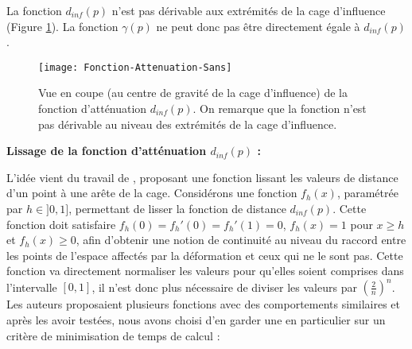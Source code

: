\begin{center}
\end{center}

\newpage

La fonction $d_{inf}(p)$ n'est pas dérivable aux extrémités de la cage d'influence
(Figure \ref{MELAtN}). La fonction $\gamma(p)$ ne peut donc pas être
directement égale à $d_{inf}(p)$.

\begin{figure}[!ht]
\texttt{[image: Fonction-Attenuation-Sans]}

\caption[Fonction d'atténuation $d_{inf}(p)$] {Vue en coupe (au centre de
gravité de la cage d'influence) de la fonction d'atténuation $d_{inf}(p)$. On
remarque que la fonction n'est pas dérivable au niveau des extrémités de la
cage d'influence.}

\label{MELAtN}

\end{figure}

\textbf{Lissage de la fonction d'atténuation $d_{inf}(p)$ :}

L'idée vient du travail de \cite{GPCP13}, proposant une fonction lissant les
valeurs de distance d'un point à une arête de la cage. Considérons une
fonction $f_h(x)$, paramétrée par $h \in ]0, 1]$, permettant de lisser la
fonction de distance $d_{inf}(p)$. Cette fonction doit satisfaire $f_h(0) =
f_h'(0) = f_h'(1) = 0$, $f_h(x)=1$ pour $x \geq h$ et $f_h(x) \geq 0$, afin
d'obtenir une notion de continuité au niveau du raccord entre les points de
l'espace affectés par la déformation et ceux qui ne le sont pas. Cette
fonction va directement normaliser les valeurs pour qu'elles soient comprises
dans l'intervalle $[0,1]$, il n'est donc plus nécessaire de diviser les
valeurs par $(\frac{2}{n})^n$. Les auteurs proposaient plusieurs fonctions
avec des comportements similaires et après les avoir testées, nous avons
choisi d'en garder une en particulier sur un critère de minimisation de temps
de calcul :

